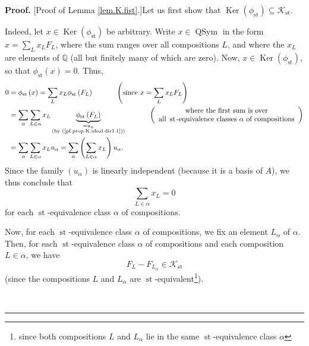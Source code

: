\documentclass[numbers=enddot,12pt,final,onecolumn,notitlepage]{scrartcl}%
\theoremstyle{definition}
\newenvironment{proof}[1][Proof]{\noindent\textbf{#1.} }{\ \rule{0.5em}{0.5em}}
\let\sumnonlimits\sum
\renewcommand{\sum}{\sumnonlimits\limits}
\begin{document}
\begin{proof}
[Proof of Lemma \ref{lem.K.fist}.]Let us first show that $\operatorname*{Ker}%
\left(  \phi_{\operatorname*{st}}\right)  \subseteq\mathcal{K}%
_{\operatorname*{st}}$.

Indeed, let $x\in\operatorname*{Ker}\left(  \phi_{\operatorname*{st}}\right)
$ be arbitrary. Write $x\in\operatorname*{QSym}$ in the form $x=\sum_{L}%
x_{L}F_{L}$, where the sum ranges over all compositions $L$, and where the
$x_{L}$ are elements of $\mathbb{Q}$ (all but finitely many of which are
zero). Now, $x\in\operatorname*{Ker}\left(  \phi_{\operatorname*{st}}\right)
$, so that $\phi_{\operatorname*{st}}\left(  x\right)  =0$. Thus,%
\begin{align*}
0  &  =\phi_{\operatorname*{st}}\left(  x\right)  =\sum_{L}x_{L}%
\phi_{\operatorname*{st}}\left(  F_{L}\right)  \ \ \ \ \ \ \ \ \ \ \left(
\text{since }x=\sum_{L}x_{L}F_{L}\right) \\
&  =\sum_{\alpha}\sum_{L\in\alpha}x_{L}\underbrace{\phi_{\operatorname*{st}%
}\left(  F_{L}\right)  }_{\substack{=u_{\alpha}\\\text{(by
(\ref{pf.prop.K.ideal.dir1.1}))}}}\ \ \ \ \ \ \ \ \ \ \left(
\begin{array}
[c]{c}%
\text{where the first sum is over}\\
\text{all }\operatorname*{st}\text{-equivalence classes }\alpha\text{ of
compositions}%
\end{array}
\right) \\
&  =\sum_{\alpha}\sum_{L\in\alpha}x_{L}u_{\alpha}=\sum_{\alpha}\left(
\sum_{L\in\alpha}x_{L}\right)  u_{\alpha}.
\end{align*}
Since the family $\left(  u_{\alpha}\right)  $ is linearly independent
(because it is a basis of $A$), we thus conclude that
\begin{equation}
\sum_{L\in\alpha}x_{L}=0 \label{pf.prop.K.ideal.dir1.2}%
\end{equation}
for each $\operatorname*{st}$-equivalence class $\alpha$ of compositions.

Now, for each $\operatorname*{st}$-equivalence class $\alpha$ of compositions,
we fix an element $L_{\alpha}$ of $\alpha$. Then, for each $\operatorname*{st}%
$-equivalence class $\alpha$ of compositions and each composition $L\in\alpha
$, we have
\begin{equation}
F_{L}-F_{L_{\alpha}}\in\mathcal{K}_{\operatorname*{st}}
\label{pf.prop.K.ideal.dir1.3}%
\end{equation}
(since the compositions $L$ and $L_{\alpha}$ are $\operatorname*{st}%
$-equivalent\footnote{since both compositions $L$ and $L_{\alpha}$ lie in the
same $\operatorname*{st}$-equivalence class $\alpha$}).


\end{proof}
\end{document}
